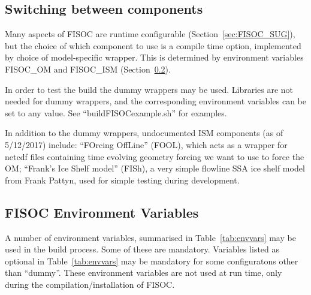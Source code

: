 \documentclass[11pt]{article}
\begin{document}
\subsection{Switching between components}

Many aspects of FISOC are runtime configurable (Section~\ref{sec:FISOC_SUG}), 
but the choice of which component to use is a compile time option, implemented 
by choice of model-specific wrapper. 
This is determined by environment variables FISOC\_OM and FISOC\_ISM 
(Section~\ref{sec:EnvVars}). 

In order to test the build the dummy wrappers may be used. 
Libraries are not needed for dummy wrappers, and the corresponding 
environment variables can be set to any value.
See  ``buildFISOCexample.sh'' for examples. 

In addition to the dummy wrappers, undocumented ISM components 
(as of 5/12/2017) include: 
``FOrcing OffLine'' (FOOL), which acts as a wrapper for netcdf files 
containing time evolving geometry forcing we want to use to force the 
OM; 
``Frank's Ice Shelf model'' (FISh), a very simple flowline SSA 
ice shelf model from Frank Pattyn, used for simple testing during 
development.



\subsection{FISOC Environment Variables}
\label{sec:EnvVars}

A number of  environment variables, summarised in Table~\ref{tab:envvars}
may be used in the build process.
Some of these are mandatory. 
Variables listed as optional in Table~\ref{tab:envvars}
may be mandatory for some configuratons 
other than ``dummy''.
These environment variables are not used at run time, only during 
the compilation/installation of FISOC.
\end{document}
